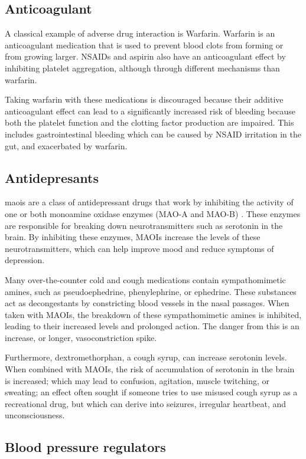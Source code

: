 \subsection{Anticoagulant}

A classical example of adverse drug interaction is Warfarin.  Warfarin is an anticoagulant medication that is used to prevent blood clots from forming or from growing larger. NSAIDs and aspirin also have an anticoagulant effect by inhibiting platelet aggregation, although through different mechanisms than warfarin.

Taking warfarin with these medications is discouraged because their additive anticoagulant effect can lead to a significantly increased risk of bleeding because both the platelet function and the clotting factor production are impaired. This includes gastrointestinal bleeding which can be caused by NSAID irritation in the gut, and exacerbated by warfarin.

\subsection{Antidepresants}

\gls{maois} are a class of antidepressant drugs that work by inhibiting the activity of one or both monoamine oxidase enzymes (MAO-A and MAO-B) \cite{Edinoff2022}. These enzymes are responsible for breaking down neurotransmitters such as serotonin in the brain. By inhibiting these enzymes, MAOIs increase the levels of these neurotransmitters, which can help improve mood and reduce symptoms of depression.

Many over-the-counter cold and cough medications contain sympathomimetic amines, such as pseudoephedrine, phenylephrine, or ephedrine. These substances act as decongestants by constricting blood vessels in the nasal passages.  When taken with MAOIs, the breakdown of these sympathomimetic amines is inhibited, leading to their increased levels and prolonged action. The danger from this is an increase, or longer, vasoconstriction spike.

Furthermore, dextromethorphan, a cough syrup, can increase serotonin levels. When combined with MAOIs, the risk of accumulation of serotonin in the brain is increased; which may lead to confusion, agitation, muscle twitching, or sweating; an effect often sought if someone tries to use misused cough syrup as a recreational drug, but which can derive into seizures, irregular heartbeat, and unconsciousness.

\subsection{Blood pressure regulators}

